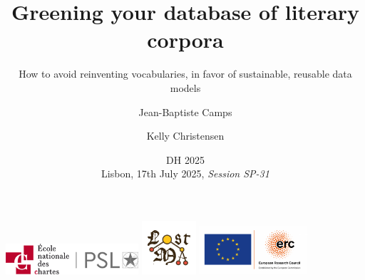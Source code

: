 \documentclass[xcolor=table]{beamer}
\title{Greening your database of literary corpora}
\subtitle{How to avoid reinventing vocabularies,
  in favor of sustainable, reusable data models}
\author{Jean-Baptiste Camps \and Kelly Christensen}
\institute{École nationale des chartes, PSL}
\date{DH 2025\\Lisbon, 17th July 2025, \textit{Session SP-31}}
\begin{document}
\begin{frame}

	\maketitle

	\begin{center}
		\vspace*{-3cm}
		\centering
		\includegraphics[width=0.37\textwidth]{img/logo-enc.png} \hfill
	    \includegraphics[width=0.15\textwidth]{img/logo_lostma.png} \hfill
	    \includegraphics[width=0.3\textwidth]{img/logo-erc.png}
	\end{center}

\end{frame}
\end{document}
